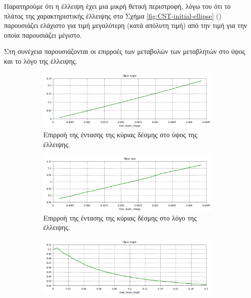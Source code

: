 Παρατηρούμε ότι η έλλειψη έχει μια μικρή θετική περιστροφή, λόγω του ότι το πλάτος της χαρακτηριστικής έλλειψης στο Σχήμα \ref{fig:CST-initial-ellipse} () παρουσιάζει ελάχιστο για τιμή μεγαλύτερη (κατά απόλυτη τιμή) από την τιμή για την οποία παρουσιάζει μέγιστο.

Στη συνέχεια παρουσιάζονται οι επιρροές των μεταβολών των μεταβλητών στο ύψος και το λόγο της έλλειψης.

\begin{figure}[tph]	
	\centering
	\begin{subfigure}{0.47\textwidth}
		\includegraphics[width=\linewidth]{figures/CST-variable-analysis/CST-ellipse-height-by-bunch-intensity}
		\centering
		\caption{Επιρροή της έντασης της κύριας δέσμης στο ύψος της έλλειψης.}
		\label{fig:CST-ellipse-height-by-bunch-intensity}
	\end{subfigure}
	\hfill
	\begin{subfigure}{0.47\textwidth}
		\includegraphics[width=\linewidth]{figures/CST-variable-analysis/CST-ellipse-ratio-by-bunch-intensity}
		\centering
		\caption{Επιρροή της έντασης της κύριας δέσμης στο λόγο της έλλειψης.}
		\label{fig:CST-ellipse-ratio-by-bunch-intensity}
	\end{subfigure}	
	\par\bigskip	
	\begin{subfigure}{0.47\textwidth}
		\includegraphics[width=\linewidth]{figures/CST-variable-analysis/CST-ellipse-height-by-bunch-length}

\end{subfigure}
\end{figure}
